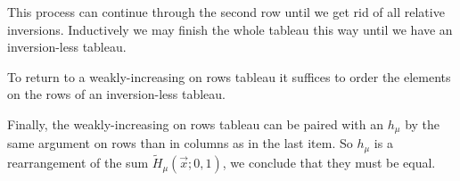 \documentclass[12pt]{memoir}
\begin{document}
\begin{ptcbr}
\begin{itemize}
        This process can continue through the second row until we get rid of all relative inversions. Inductively we may finish the whole tableau this way until we have an inversion-less tableau.\par 
        To return to a weakly-increasing on rows tableau it suffices to order the elements on the rows of an inversion-less tableau.\par 
        Finally, the weakly-increasing on rows tableau can be paired with an $h_\mu$ by the same argument on rows than in columns as in the last item. So $h_\mu$ is a rearrangement of the sum $\tilde{H}_\mu(\vec{x};0,1)$, we conclude that they must be equal.
    \end{itemize}
\end{ptcbr}
\end{document}
